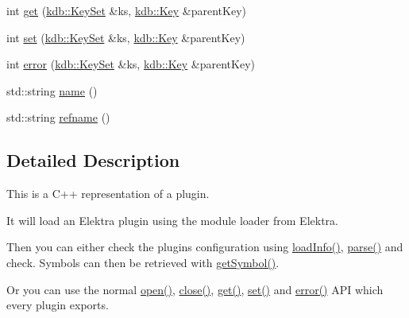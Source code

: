 \begin{DoxyCompactItemize}
\item 
int \hyperlink{classkdb_1_1tools_1_1Plugin_a2aa6ff55f9cf81a59d2a8d271fe68e0f}{get} (\hyperlink{classkdb_1_1KeySet}{kdb\-::\-Key\-Set} \&ks, \hyperlink{classkdb_1_1Key}{kdb\-::\-Key} \&parent\-Key)
\item 
int \hyperlink{classkdb_1_1tools_1_1Plugin_abf84d512b48f6fa1b89636217537cde0}{set} (\hyperlink{classkdb_1_1KeySet}{kdb\-::\-Key\-Set} \&ks, \hyperlink{classkdb_1_1Key}{kdb\-::\-Key} \&parent\-Key)
\item 
int \hyperlink{classkdb_1_1tools_1_1Plugin_a8ec348b49a34ef17fda64cb289b8cf64}{error} (\hyperlink{classkdb_1_1KeySet}{kdb\-::\-Key\-Set} \&ks, \hyperlink{classkdb_1_1Key}{kdb\-::\-Key} \&parent\-Key)
\item 
std\-::string \hyperlink{classkdb_1_1tools_1_1Plugin_ae4b82f943d0cdb0dd355924aa3201d6f}{name} ()
\item 
std\-::string \hyperlink{classkdb_1_1tools_1_1Plugin_af2fa892b6a8861419b1c1c2b3d39ed1e}{refname} ()
\end{DoxyCompactItemize}


\subsection{Detailed Description}
This is a C++ representation of a plugin.

It will load an Elektra plugin using the module loader from Elektra.

Then you can either check the plugins configuration using \hyperlink{classkdb_1_1tools_1_1Plugin_a3a0c6a956d1714002ef9baf8c9d99167}{load\-Info()}, \hyperlink{classkdb_1_1tools_1_1Plugin_adfcba2fbdeb436a1083410df804d5fb0}{parse()} and check. Symbols can then be retrieved with \hyperlink{classkdb_1_1tools_1_1Plugin_aca31140802ab463d5bddd95dee73194d}{get\-Symbol()}.

Or you can use the normal \hyperlink{classkdb_1_1tools_1_1Plugin_a680a490123b5290441d76ef2c1e3f1fa}{open()}, \hyperlink{classkdb_1_1tools_1_1Plugin_a40b5fd413f3f6da735680ed8d7c8a6a2}{close()}, \hyperlink{classkdb_1_1tools_1_1Plugin_a2aa6ff55f9cf81a59d2a8d271fe68e0f}{get()}, \hyperlink{classkdb_1_1tools_1_1Plugin_abf84d512b48f6fa1b89636217537cde0}{set()} and \hyperlink{classkdb_1_1tools_1_1Plugin_a8ec348b49a34ef17fda64cb289b8cf64}{error()} A\-P\-I which every plugin exports. 

